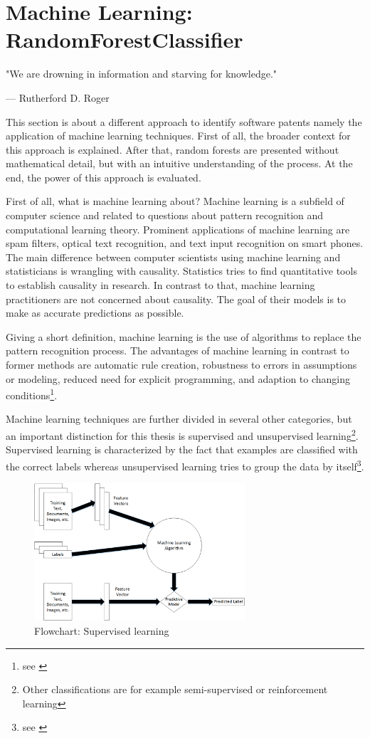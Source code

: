 \documentclass[12pt, a4paper]{scrartcl}
\theoremstyle{definition}
\begin{document}
\section{Machine Learning: RandomForestClassifier} %
\label{sub:machine_learning_randomforestclassifier}

\epigraph{"We are drowning in information and starving for knowledge."}{---
\textup{Rutherford D. Roger}}

This section is about a different approach to identify software patents namely
the application of machine learning techniques. First of all, the broader
context for this approach is explained. After that, random forests are
presented without mathematical detail, but with an intuitive understanding of
the process. At the end, the power of this approach is evaluated.

First of all, what is machine learning about? Machine learning is a subfield of
computer science and related to questions about pattern recognition and
computational learning theory. Prominent applications of machine learning are
spam filters, optical text recognition, and text input recognition on smart
phones. The main difference between computer scientists using machine learning
and statisticians is wrangling with causality. Statistics tries to find
quantitative tools to establish causality in research. In contrast to that,
machine learning practitioners are not concerned about causality. The goal of
their models is to make as accurate predictions as possible.

Giving a short definition, machine learning is the use of algorithms to replace
the pattern recognition process. The advantages of machine learning in contrast
to former methods are automatic rule creation, robustness to errors in
assumptions or modeling, reduced need for explicit programming, and adaption to
changing conditions\footnote{see \cite{kulkarni2011elementary}}.

Machine learning techniques are further divided in several other categories,
but an important distinction for this thesis is supervised and unsupervised
learning\footnote{Other classifications are for example semi-supervised or
reinforcement learning}. Supervised learning is characterized by the fact that
examples are classified with the correct labels whereas unsupervised learning
tries to group the data by itself\footnote{see \cite{kulkarni2011elementary}}.

\begin{figure}[tb]
	\centering
	\includegraphics[width = 0.7\textwidth]{graphics/ml_flowchart.png}
	\caption{Flowchart: Supervised learning}
	\label{fig:figure1}
\end{figure}
\end{document}
